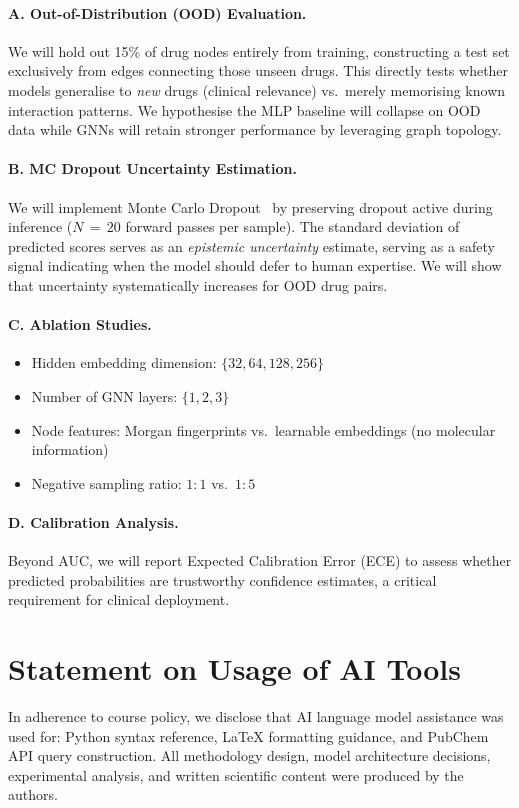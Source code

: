 \documentclass[11pt,a4paper]{article}
\begin{document}
\paragraph{A. Out-of-Distribution (OOD) Evaluation.}
We will hold out 15\% of drug nodes entirely from training, constructing
a test set exclusively from edges connecting those unseen drugs.
This directly tests whether models generalise to \emph{new} drugs (clinical
relevance) vs.\ merely memorising known interaction patterns.
We hypothesise the MLP baseline will collapse on OOD data while GNNs
will retain stronger performance by leveraging graph topology.

\paragraph{B. MC Dropout Uncertainty Estimation.}
We will implement Monte Carlo Dropout~\cite{gal2016} by preserving dropout
active during inference ($N\,{=}\,20$ forward passes per sample).
The standard deviation of predicted scores serves as an \emph{epistemic
uncertainty} estimate, serving as a safety signal indicating when the model should
defer to human expertise.
We will show that uncertainty systematically increases for OOD drug pairs.

\paragraph{C. Ablation Studies.}
\begin{itemize}[noitemsep]
  \item Hidden embedding dimension: $\{32, 64, 128, 256\}$
  \item Number of GNN layers: $\{1, 2, 3\}$
  \item Node features: Morgan fingerprints vs.\ learnable embeddings
        (no molecular information)
  \item Negative sampling ratio: $1\!:\!1$ vs.\ $1\!:\!5$
\end{itemize}

\paragraph{D. Calibration Analysis.}
Beyond AUC, we will report Expected Calibration Error (ECE) to assess
whether predicted probabilities are trustworthy confidence estimates, a
critical requirement for clinical deployment.

\section*{Statement on Usage of AI Tools}
In adherence to course policy, we disclose that AI language model
assistance was used for: Python syntax reference, LaTeX formatting
guidance, and PubChem API query construction.
All methodology design, model architecture decisions, experimental
analysis, and written scientific content were produced by the authors.



\end{document}
